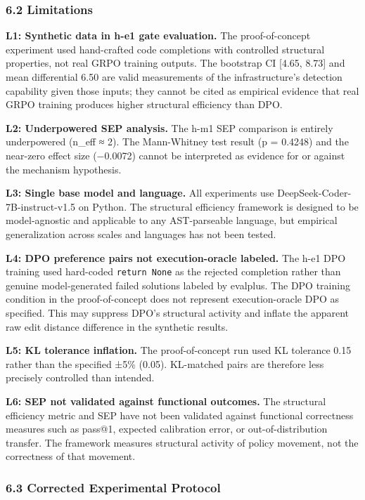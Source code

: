\subsubsection{6.2 Limitations}

\textbf{L1: Synthetic data in h-e1 gate evaluation.} The proof-of-concept experiment used hand-crafted code completions with controlled structural properties, not real GRPO training outputs. The bootstrap CI [4.65, 8.73] and mean differential 6.50 are valid measurements of the infrastructure's detection capability given those inputs; they cannot be cited as empirical evidence that real GRPO training produces higher structural efficiency than DPO.

\textbf{L2: Underpowered SEP analysis.} The h-m1 SEP comparison is entirely underpowered (n_eff ≈ 2). The Mann-Whitney test result (p = 0.4248) and the near-zero effect size (−0.0072) cannot be interpreted as evidence for or against the mechanism hypothesis.

\textbf{L3: Single base model and language.} All experiments use DeepSeek-Coder-7B-instruct-v1.5 on Python. The structural efficiency framework is designed to be model-agnostic and applicable to any AST-parseable language, but empirical generalization across scales and languages has not been tested.

\textbf{L4: DPO preference pairs not execution-oracle labeled.} The h-e1 DPO training used hard-coded \texttt{return None} as the rejected completion rather than genuine model-generated failed solutions labeled by evalplus. The DPO training condition in the proof-of-concept does not represent execution-oracle DPO as specified. This may suppress DPO's structural activity and inflate the apparent raw edit distance difference in the synthetic results.

\textbf{L5: KL tolerance inflation.} The proof-of-concept run used KL tolerance 0.15 rather than the specified ±5\% (0.05). KL-matched pairs are therefore less precisely controlled than intended.

\textbf{L6: SEP not validated against functional outcomes.} The structural efficiency metric and SEP have not been validated against functional correctness measures such as pass@1, expected calibration error, or out-of-distribution transfer. The framework measures structural activity of policy movement, not the correctness of that movement.

\subsubsection{6.3 Corrected Experimental Protocol}

